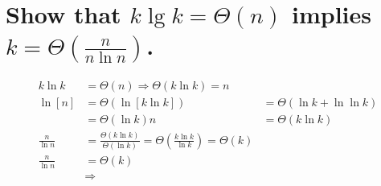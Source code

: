 \section[Problem 3]{Show that $k \lg k = \Theta(n)$ implies $k = \Theta\left(\frac{n}{n \ln n}\right)$.}
\begin{align*}
	k \ln k &= \Theta(n) \Longrightarrow \Theta(k \ln k) = n \\
	\ln [n] &= \Theta ( \ln [k \ln k ] )
	&=
	\Theta (\ln k + \ln \ln k) \\
	&= \Theta(\ln k)
	n &= \Theta(k \ln k) \\
	\frac{n}{\ln n} &= \frac{\Theta(k \ln k)}{\Theta(\ln k)} = \Theta \left( \frac{k \ln k}{\ln k} \right) = \Theta(k) \\
	\frac{n}{\ln n} &= \Theta(k) \\
	& \Longrightarrow 
\end{align*}
